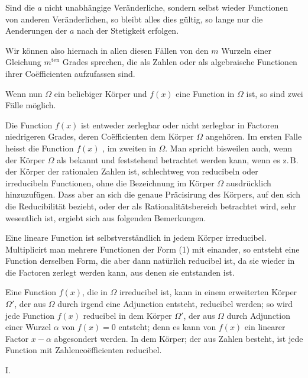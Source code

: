 
Sind die $a$ nicht unabhängige Veränderliche, sondern selbst wieder Functionen von anderen Veränderlichen, so bleibt alles dies gültig, so lange nur die Aenderungen der $a$ nach der Stetigkeit erfolgen.

Wir können also hiernach in allen diesen Fällen von den $m$ Wurzeln einer Gleichung $m^{\text{ten}}$ Grades sprechen, die als Zahlen oder als algebraische Functionen ihrer Co\"efficienten aufzufassen sind.

Wenn nun $\Omega$ ein beliebiger Körper und $f(x)$ eine Function in $\Omega$ ist, so sind zwei Fälle möglich.

Die Function $f(x)$ ist entweder zerlegbar oder nicht zerlegbar in Factoren niedrigeren Grades, deren Co\"efficienten dem Körper $\Omega$ angehören. Im ersten Falle heisst die Function $f(x)$ , im zweiten  in $\Omega$. Man spricht bisweilen auch, wenn der Körper $\Omega$ als bekannt und feststehend betrachtet werden kann, wenn es z.\,B. der Körper der rationalen Zahlen ist, schlechtweg von reducibeln oder irreducibeln Functionen, ohne die Bezeichnung \textquotedbl{}im Körper $\Omega$\textquotedbl{} ausdrücklich hinzuzufügen. Dass aber an sich die genaue Präcisirung des Körpers, auf den sich die Reducibilität bezieht, oder der als Rationalitätsbereich betrachtet wird, sehr wesentlich ist, ergiebt sich aus folgenden Bemerkungen.

Eine lineare Function ist selbstverständlich in jedem Körper irreducibel. Multiplicirt man mehrere Functionen der Form (1) mit einander, so entsteht eine Function derselben Form, die aber dann natürlich reducibel ist, da sie wieder in die Factoren zerlegt werden kann, aus denen sie entstanden ist.

Eine Function $f(x)$, die in $\Omega$ irreducibel ist, kann in einem erweiterten Körper $\Omega'$, der aus $\Omega$ durch irgend eine Adjunction entsteht, reducibel werden; so wird jede Function $f(x)$ reducibel in dem Körper $\Omega'$, der aus $\Omega$ durch Adjunction einer Wurzel $\alpha$ von $f(x) = 0$ entsteht; denn es kann von $f(x)$ ein linearer Factor $x - \alpha$ abgesondert werden. In dem Körper; der aus  Zahlen besteht, ist jede Function mit Zahlenco\"efficienten reducibel. %

I. 
